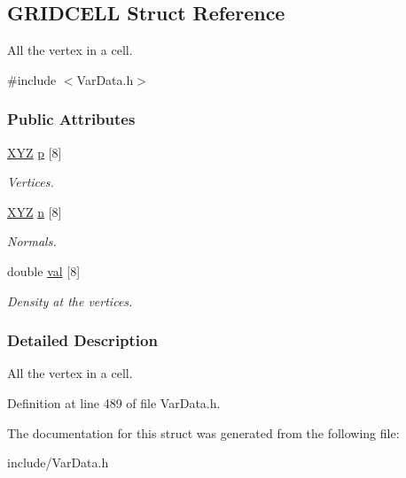 \hypertarget{structGRIDCELL}{\subsection{\-G\-R\-I\-D\-C\-E\-L\-L \-Struct \-Reference}
\label{structGRIDCELL}
}


\-All the vertex in a cell.  




{\ttfamily \#include $<$\-Var\-Data.\-h$>$}

\subsubsection*{\-Public \-Attributes}
\begin{DoxyCompactItemize}
\item 
\hypertarget{structGRIDCELL_af46bddc16e32b74aeff274ceaf5562f8}{\hyperlink{structXYZ}{\-X\-Y\-Z} \hyperlink{structGRIDCELL_af46bddc16e32b74aeff274ceaf5562f8}{p} \mbox{[}8\mbox{]}}\label{structGRIDCELL_af46bddc16e32b74aeff274ceaf5562f8}

\begin{DoxyCompactList}\small\item\em \-Vertices. \end{DoxyCompactList}\item 
\hypertarget{structGRIDCELL_a50b3da89748a7768f305af0e5a186332}{\hyperlink{structXYZ}{\-X\-Y\-Z} \hyperlink{structGRIDCELL_a50b3da89748a7768f305af0e5a186332}{n} \mbox{[}8\mbox{]}}\label{structGRIDCELL_a50b3da89748a7768f305af0e5a186332}

\begin{DoxyCompactList}\small\item\em \-Normals. \end{DoxyCompactList}\item 
\hypertarget{structGRIDCELL_a98dc06e4ef0443c670c22157e89ee97d}{double \hyperlink{structGRIDCELL_a98dc06e4ef0443c670c22157e89ee97d}{val} \mbox{[}8\mbox{]}}\label{structGRIDCELL_a98dc06e4ef0443c670c22157e89ee97d}

\begin{DoxyCompactList}\small\item\em \-Density at the vertices. \end{DoxyCompactList}\end{DoxyCompactItemize}


\subsubsection{\-Detailed \-Description}
\-All the vertex in a cell. 

\-Definition at line 489 of file \-Var\-Data.\-h.



\-The documentation for this struct was generated from the following file\-:\begin{DoxyCompactItemize}
\item 
include/\-Var\-Data.\-h\end{DoxyCompactItemize}

